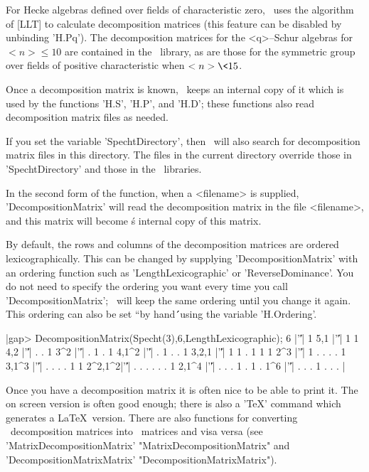 For Hecke algebras defined over fields of characteristic zero, \Specht\
uses the algorithm of [LLT] to calculate decomposition matrices 
(this feature can be disabled by unbinding 'H.Pq'). The decomposition 
matrices for the <q>--Schur algebras for $<n>\le10$ are contained in the 
\Specht\ library, as are those for the symmetric group over fields of 
positive characteristic when $<n>\<15$.

Once a decomposition matrix is known, \Specht\ keeps an internal copy 
of it which is used by the functions 'H.S', 'H.P', and 'H.D'; these
functions also read decomposition matrix files as needed.

If you set the variable 'SpechtDirectory', then \Specht\ will also search
for decomposition matrix files in this directory. The files in the current
directory override those in 'SpechtDirectory' and those in the \Specht\
libraries.

In the second form of the function, when a <filename> is supplied, 
'DecompositionMatrix' will read the decomposition matrix in the file 
<filename>, and this matrix will become \Specht\'s internal copy of
this matrix.

By default, the rows and columns of the decomposition matrices are ordered
lexicographically. This can be changed by supplying 'DecompositionMatrix' 
with an ordering function such as 'LengthLexicographic' or 
'ReverseDominance'. You do not need to specify the ordering you want
every time you call 'DecompositionMatrix'; \Specht\ will keep the same
ordering until you change it again. This ordering can also be set ``by 
hand\'\'\ using the variable 'H.Ordering'. \index{H.Ordering!Specht}

|gap> DecompositionMatrix(Specht(3),6,LengthLexicographic);
6      |'\|'| 1             
5,1    |'\|'| 1 1           
4,2    |'\|'| . . 1         
3^2    |'\|'| . 1 . 1       
4,1^2  |'\|'| . 1 . . 1     
3,2,1  |'\|'| 1 1 . 1 1 1   
2^3    |'\|'| 1 . . . . 1   
3,1^3  |'\|'| . . . . 1 1   
2^2,1^2|'\|'| . . . . . . 1
2,1^4  |'\|'| . . . 1 . 1 . 
1^6    |'\|'| . . . 1 . . . |

Once you have a decomposition matrix it is often nice to be able
to print it. The on screen version is often good enough; there is also
a 'TeX' command  which generates a \LaTeX\ version. There are also 
functions for converting \Specht\ decomposition matrices into \GAP\ 
matrices and visa versa (see 'MatrixDecompositionMatrix' 
"MatrixDecompositionMatrix" and 'DecompositionMatrixMatrix' 
"DecompositionMatrixMatrix").

